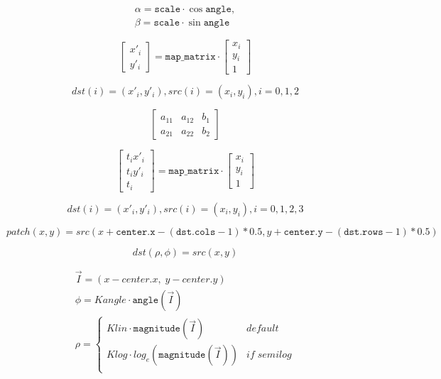 \documentclass{article}
\begin{document}
\[\begin{array}{l} \alpha = \texttt{scale} \cdot \cos \texttt{angle} , \\ \beta = \texttt{scale} \cdot \sin \texttt{angle} \end{array}\]
\pagebreak

\[\begin{bmatrix} x'_i \\ y'_i \end{bmatrix} = \texttt{map_matrix} \cdot \begin{bmatrix} x_i \\ y_i \\ 1 \end{bmatrix}\]
\pagebreak

\[dst(i)=(x'_i,y'_i), src(i)=(x_i, y_i), i=0,1,2\]
\pagebreak

\[\begin{bmatrix} a_{11} & a_{12} & b_1 \\ a_{21} & a_{22} & b_2 \end{bmatrix}\]
\pagebreak

\[\begin{bmatrix} t_i x'_i \\ t_i y'_i \\ t_i \end{bmatrix} = \texttt{map_matrix} \cdot \begin{bmatrix} x_i \\ y_i \\ 1 \end{bmatrix}\]
\pagebreak

\[dst(i)=(x'_i,y'_i), src(i)=(x_i, y_i), i=0,1,2,3\]
\pagebreak

\[patch(x, y) = src(x + \texttt{center.x} - ( \texttt{dst.cols} -1)*0.5, y + \texttt{center.y} - ( \texttt{dst.rows} -1)*0.5)\]
\pagebreak

\[ dst(\rho , \phi ) = src(x,y) \]
\pagebreak

\[ \begin{array}{l} \vec{I} = (x - center.x, \;y - center.y) \\ \phi = Kangle \cdot \texttt{angle} (\vec{I}) \\ \rho = \left\{\begin{matrix} Klin \cdot \texttt{magnitude} (\vec{I}) & default \\ Klog \cdot log_e(\texttt{magnitude} (\vec{I})) & if \; semilog \\ \end{matrix}\right. \end{array} \]
\pagebreak
\end{document}
